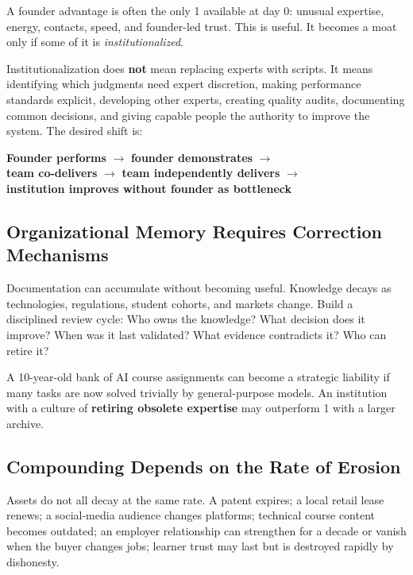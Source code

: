 A founder advantage is often the only 1 available at day 0: unusual expertise, energy, contacts, speed, and founder-led trust. This is useful. It becomes a moat only if some of it is \textit{institutionalized}.

Institutionalization does \textbf{not} mean replacing experts with scripts. It means identifying which judgments need expert discretion, making performance standards explicit, developing other experts, creating quality audits, documenting common decisions, and giving capable people the authority to improve the system. The desired shift is:
\begin{center}
\small
\textbf{Founder performs} $\to$ \textbf{founder demonstrates} $\to$ \\
\textbf{team co-delivers} $\to$ \textbf{team independently delivers} $\to$ \\
\textbf{institution improves without founder as bottleneck}
\end{center}

\subsection{Organizational Memory Requires Correction Mechanisms}
\label{sec:organizational_memory_correction}

Documentation can accumulate without becoming useful. Knowledge decays as technologies, regulations, student cohorts, and markets change. Build a disciplined review cycle: Who owns the knowledge? What decision does it improve? When was it last validated? What evidence contradicts it? Who can retire it?

A 10-year-old bank of AI course assignments can become a strategic liability if many tasks are now solved trivially by general-purpose models. An institution with a culture of \textbf{retiring obsolete expertise} may outperform 1 with a larger archive.

\subsection{Compounding Depends on the Rate of Erosion}
\label{sec:compounding_rate_of_erosion}

Assets do not all decay at the same rate. A patent expires; a local retail lease renews; a social-media audience changes platforms; technical course content becomes outdated; an employer relationship can strengthen for a decade or vanish when the buyer changes jobs; learner trust may last but is destroyed rapidly by dishonesty.


